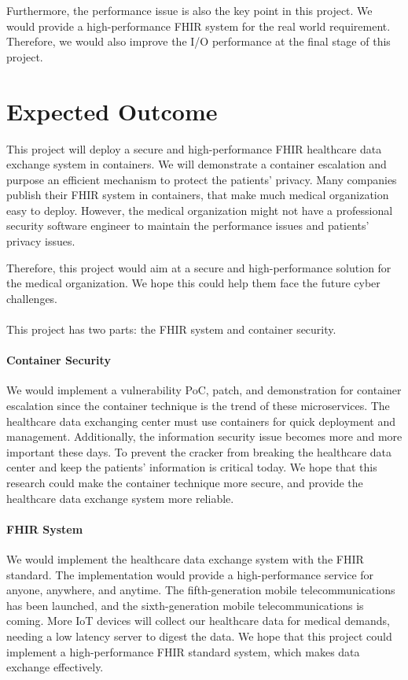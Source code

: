 \documentclass[12pt,a4paper]{article}
\begin{document}
Furthermore, the performance issue is also the key point in this project. We would provide a
high-performance FHIR system for the real world requirement. Therefore, we would also improve the
I/O performance at the final stage of this project.


\section{Expected Outcome}
This project will deploy a secure and high-performance FHIR healthcare data exchange system
in containers. We will demonstrate a container escalation and purpose an efficient mechanism
to protect the patients' privacy. Many companies publish their FHIR system in containers,
that make much medical organization easy to deploy. However, the medical organization might
not have a professional security software engineer to maintain the performance issues and
patients' privacy issues.

Therefore, this project would aim at a secure and high-performance solution for the medical
organization. We hope this could help them face the future cyber challenges.
\paragraph{}
This project has two parts: the FHIR system and container security.
\paragraph{Container Security}
We would implement a vulnerability PoC, patch, and demonstration for container escalation
since the container technique is the trend of these microservices. The healthcare data
exchanging center must use containers for quick deployment and management. Additionally, the
information security issue becomes more and more important these days. To prevent the
cracker from breaking the healthcare data center and keep the patients' information is critical
today. We hope that this research could make the container technique more secure, and provide
the healthcare data exchange system more reliable.

\paragraph{FHIR System}
We would implement the healthcare data exchange system with the FHIR standard. The implementation
would provide a high-performance service for anyone, anywhere, and anytime. The fifth-generation
mobile telecommunications has been launched, and the sixth-generation mobile telecommunications is
coming.  More IoT devices will collect our healthcare data for medical demands, needing a low
latency server to digest the data. We hope that this project could implement a high-performance FHIR
standard system, which makes data exchange effectively.
\end{document}
